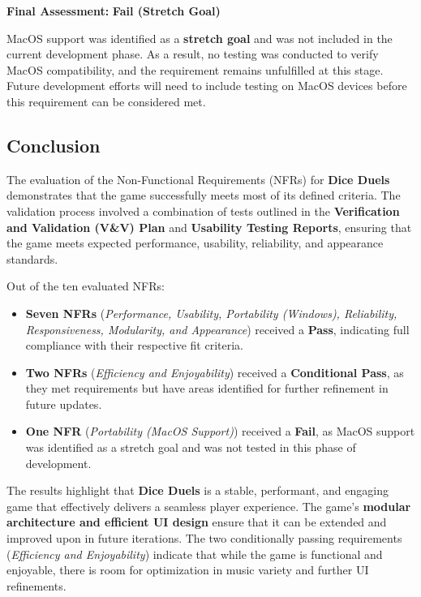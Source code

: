 \documentclass[12pt, titlepage]{article}
\begin{document}
\textbf{Final Assessment:} \textbf{Fail (Stretch Goal)}  

MacOS support was identified as a \textbf{stretch goal} and was not included in the current development phase. As a result, no testing was conducted to verify MacOS compatibility, and the requirement remains unfulfilled at this stage. Future development efforts will need to include testing on MacOS devices before this requirement can be considered met.


\subsection{Conclusion}

The evaluation of the Non-Functional Requirements (NFRs) for \textbf{Dice Duels} demonstrates that the game successfully meets most of its defined criteria. The validation process involved a combination of tests outlined in the \textbf{Verification and Validation (V\&V) Plan} and \textbf{Usability Testing Reports}, ensuring that the game meets expected performance, usability, reliability, and appearance standards.

Out of the ten evaluated NFRs:
\begin{itemize}
    \item \textbf{Seven NFRs} (\textit{Performance, Usability, Portability (Windows), Reliability, Responsiveness, Modularity, and Appearance}) received a \textbf{Pass}, indicating full compliance with their respective fit criteria.
    \item \textbf{Two NFRs} (\textit{Efficiency and Enjoyability}) received a \textbf{Conditional Pass}, as they met requirements but have areas identified for further refinement in future updates.
    \item \textbf{One NFR} (\textit{Portability (MacOS Support)}) received a \textbf{Fail}, as MacOS support was identified as a stretch goal and was not tested in this phase of development.
\end{itemize}

The results highlight that \textbf{Dice Duels} is a stable, performant, and engaging game that effectively delivers a seamless player experience. The game's \textbf{modular architecture and efficient UI design} ensure that it can be extended and improved upon in future iterations. The two conditionally passing requirements (\textit{Efficiency and Enjoyability}) indicate that while the game is functional and enjoyable, there is room for optimization in music variety and further UI refinements.
\end{document}
